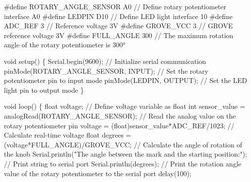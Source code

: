 \documentclass[
  letterpaper,
  DIV=11,
  numbers=noendperiod]{scrreprt}
\newenvironment{Shaded}{\begin{snugshade}}{\end{snugshade}}
\newcommand{\CommentTok}[1]{\textcolor[rgb]{0.37,0.37,0.37}{#1}}
\newcommand{\DataTypeTok}[1]{\textcolor[rgb]{0.68,0.00,0.00}{#1}}
\newcommand{\DecValTok}[1]{\textcolor[rgb]{0.68,0.00,0.00}{#1}}
\newcommand{\NormalTok}[1]{\textcolor[rgb]{0.00,0.23,0.31}{#1}}
\newcommand{\OperatorTok}[1]{\textcolor[rgb]{0.37,0.37,0.37}{#1}}
\newcommand{\PreprocessorTok}[1]{\textcolor[rgb]{0.68,0.00,0.00}{#1}}
\newcommand{\StringTok}[1]{\textcolor[rgb]{0.13,0.47,0.30}{#1}}
\begin{document}
\begin{Shaded}
\begin{Highlighting}[]
\PreprocessorTok{\#define ROTARY\_ANGLE\_SENSOR }\NormalTok{A0}\PreprocessorTok{ }\CommentTok{// Define rotary potentiometer interface A0}
\PreprocessorTok{\#define LEDPIN }\NormalTok{D10}\PreprocessorTok{ }\CommentTok{// Define LED light interface 10}
\PreprocessorTok{\#define ADC\_REF }\DecValTok{3}\PreprocessorTok{ }\CommentTok{// Reference voltage 3V}
\PreprocessorTok{\#define GROVE\_VCC }\DecValTok{3}\PreprocessorTok{ }\CommentTok{// GROVE reference voltage 3V}
\PreprocessorTok{\#define FULL\_ANGLE }\DecValTok{300}\PreprocessorTok{ }\CommentTok{// The maximum rotation angle of the rotary potentiometer is 300°}

\DataTypeTok{void}\NormalTok{ setup}\OperatorTok{()}
\OperatorTok{\{}
\NormalTok{    Serial}\OperatorTok{.}\NormalTok{begin}\OperatorTok{(}\DecValTok{9600}\OperatorTok{);} \CommentTok{// Initialize serial communication}
\NormalTok{    pinMode}\OperatorTok{(}\NormalTok{ROTARY\_ANGLE\_SENSOR}\OperatorTok{,}\NormalTok{ INPUT}\OperatorTok{);} \CommentTok{// Set the rotary potentiometer pin to input mode}
\NormalTok{    pinMode}\OperatorTok{(}\NormalTok{LEDPIN}\OperatorTok{,}\NormalTok{ OUTPUT}\OperatorTok{);} \CommentTok{// Set the LED light pin to output mode }
\OperatorTok{\}}

\DataTypeTok{void}\NormalTok{ loop}\OperatorTok{()}
\OperatorTok{\{}   
    \DataTypeTok{float}\NormalTok{ voltage}\OperatorTok{;} \CommentTok{// Define voltage variable as float}
    \DataTypeTok{int}\NormalTok{ sensor\_value }\OperatorTok{=}\NormalTok{ analogRead}\OperatorTok{(}\NormalTok{ROTARY\_ANGLE\_SENSOR}\OperatorTok{);} \CommentTok{// Read the analog value on the rotary potentiometer pin}
\NormalTok{    voltage }\OperatorTok{=} \OperatorTok{(}\DataTypeTok{float}\OperatorTok{)}\NormalTok{sensor\_value}\OperatorTok{*}\NormalTok{ADC\_REF}\OperatorTok{/}\DecValTok{1023}\OperatorTok{;} \CommentTok{// Calculate real{-}time voltage}
    \DataTypeTok{float}\NormalTok{ degrees }\OperatorTok{=} \OperatorTok{(}\NormalTok{voltage}\OperatorTok{*}\NormalTok{FULL\_ANGLE}\OperatorTok{)/}\NormalTok{GROVE\_VCC}\OperatorTok{;} \CommentTok{// Calculate the angle of rotation of the knob}
\NormalTok{    Serial}\OperatorTok{.}\NormalTok{println}\OperatorTok{(}\StringTok{"The angle between the mark and the starting position:"}\OperatorTok{);} \CommentTok{// Print string to serial port}
\NormalTok{    Serial}\OperatorTok{.}\NormalTok{println}\OperatorTok{(}\NormalTok{degrees}\OperatorTok{);} \CommentTok{// Print the rotation angle value of the rotary potentiometer to the serial port}
\NormalTok{    delay}\OperatorTok{(}\DecValTok{100}\OperatorTok{);}


\end{Highlighting}
\end{Shaded}
\end{document}

